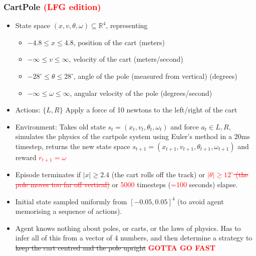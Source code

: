 \documentclass[10pt,a4paper, handout]{beamer}
\newcommand{\red}[1]{\textcolor{red}{#1}}
\begin{document}
\begin{frame}
	\frametitle{CartPole \red{(LFG edition)}}
	\begin{itemize}
		\item State space $(x, v, \theta, \omega) \subseteq \mathbb{R}^4$, representing
		\begin{itemize}
			\item $-4.8 \leq x \leq 4.8$, position of the cart (meters)
			\item $-\infty \leq v \leq \infty$, velocity of the cart (meters/second)
			\item $-28^\circ \leq \theta \leq 28^\circ$, angle of the pole (measured from vertical) (degrees)
			\item $-\infty \leq \omega \leq \infty$, angular velocity of the pole (degrees/second)  
		\end{itemize}
		\item Actions: $\{L,R\}$ Apply a force of 10 newtons to the left/right of the cart
		\item Environment: Takes old state $s_t = (x_t, v_t, \theta_t, \omega_t)$ and
		force $a_t \in {L,R}$, simulates the physics of the cartpole system using Euler's method
		in a 20ms timestep, returns the new state space 
		$s_{t+1} = (x_{t+1}, v_{t+1}, \theta_{t+1}, \omega_{t+1})$ and reward \red{$r_{t+1} = \omega$}
		\item Episode terminates if $|x| \geq 2.4$ (the cart rolls off the track)
		or \red{\sout{$|\theta| \geq 12^\circ$ (the pole moves too far off vertical)}} or \red{5000} timesteps (\red{=100} seconds)
		elapse.
		\item Initial state sampled uniformly from $[-0.05, 0.05]^4$ (to avoid agent memorising 
		a sequence of actions).
		\item Agent knows nothing about poles, or carts, or the laws of physics. Has to infer all of this from
		a vector of 4 numbers, and then determine a strategy to \sout{keep the cart centred and the pole upright}
		\red{\textbf{GOTTA GO FAST}}
	\end{itemize}
\end{frame}
\end{document}
